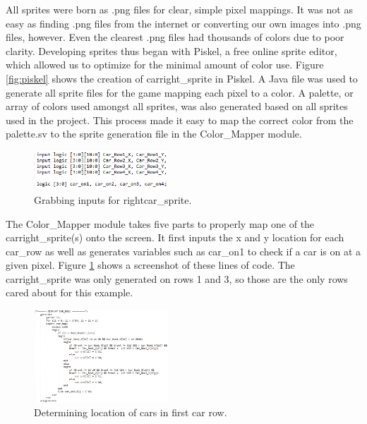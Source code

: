 \documentclass[journal, twocolumn, final,11pt,letterpaper]{IEEEtran}
\begin{document}
All sprites were born as .png files for clear, simple pixel mappings.  It was not as easy as finding .png files from the internet or converting our own images into .png files, however.  Even the clearest .png files had thousands of colors due to poor clarity.  Developing sprites thus began with Piskel, a free online sprite editor, which allowed us to optimize for the minimal amount of color use.  Figure \ref{fig:piskel} shows the creation of carright\_sprite in Piskel.  A Java file was used to generate all sprite files for the game mapping each pixel to a color. A palette, or array of colors used amongst all sprites, was also generated based on all sprites used in the project.  This process made it easy to map the correct color from the palette.sv to the sprite generation file in the Color\_Mapper module.

	\begin{figure}[H]
		\centering
		\includegraphics[width=0.45\textwidth]{sprite_description1.png}
		\caption{Grabbing inputs for rightcar\_sprite.}
		\label{fig:sprite_description1}
	\end{figure} 

The Color\_Mapper module takes five parts to properly map one of the carright\_sprite(s) onto the screen. It first inputs the x and y location for each car\_row as well as generates variables such as car\_on1 to check if a car is on at a given pixel. Figure \ref{fig:sprite_description1} shows a screenshot of these lines of code.  The carright\_sprite was only generated on rows 1 and 3, so those are the only rows cared about for this example.


	\begin{figure}[H]
		\centering
		\includegraphics[width=0.45\textwidth]{sprite_description2.png}
		\caption{Determining location of cars in first car row.}
		\label{fig:sprite_description2}
	\end{figure} 
\end{document}
